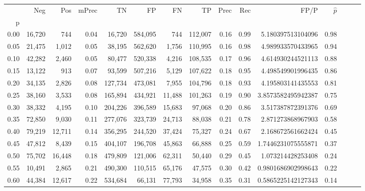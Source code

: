 \begin{tabular}{rrrrrrrrrrrrrrr}
\toprule
{} &     Neg &     Pos & mPrec &       TN &       FP &       FN &       TP &  Prec &   Rec &                  FP/P & $\hat{p}$ \\
p    &         &         &       &          &          &          &          &       &       &                       &           \\
\midrule
0.00 &  16,720 &     744 &  0.04 &   16,720 &  584,095 &      744 &  112,007 &  0.16 &  0.99 &     5.180397513104096 &      0.98 \\
0.05 &  21,475 &   1,012 &  0.05 &   38,195 &  562,620 &    1,756 &  110,995 &  0.16 &  0.98 &     4.989933570433965 &      0.94 \\
0.10 &  42,282 &   2,460 &  0.05 &   80,477 &  520,338 &    4,216 &  108,535 &  0.17 &  0.96 &     4.614930244521113 &      0.88 \\
0.15 &  13,122 &     913 &  0.07 &   93,599 &  507,216 &    5,129 &  107,622 &  0.18 &  0.95 &     4.498549901996435 &      0.86 \\
0.20 &  34,135 &   2,826 &  0.08 &  127,734 &  473,081 &    7,955 &  104,796 &  0.18 &  0.93 &     4.195803141435553 &      0.81 \\
0.25 &  38,160 &   3,533 &  0.08 &  165,894 &  434,921 &   11,488 &  101,263 &  0.19 &  0.90 &    3.8573582495942387 &      0.75 \\
0.30 &  38,332 &   4,195 &  0.10 &  204,226 &  396,589 &   15,683 &   97,068 &  0.20 &  0.86 &     3.517387872391376 &      0.69 \\
0.35 &  72,850 &   9,030 &  0.11 &  277,076 &  323,739 &   24,713 &   88,038 &  0.21 &  0.78 &     2.871273868967903 &      0.58 \\
0.40 &  79,219 &  12,711 &  0.14 &  356,295 &  244,520 &   37,424 &   75,327 &  0.24 &  0.67 &     2.168672561662424 &      0.45 \\
0.45 &  47,812 &   8,439 &  0.15 &  404,107 &  196,708 &   45,863 &   66,888 &  0.25 &  0.59 &    1.7446231075555871 &      0.37 \\
0.50 &  75,702 &  16,448 &  0.18 &  479,809 &  121,006 &   62,311 &   50,440 &  0.29 &  0.45 &     1.073214428253408 &      0.24 \\
0.55 &  10,491 &   2,865 &  0.21 &  490,300 &  110,515 &   65,176 &   47,575 &  0.30 &  0.42 &    0.9801686902998643 &      0.22 \\
0.60 &  44,384 &  12,617 &  0.22 &  534,684 &   66,131 &   77,793 &   34,958 &  0.35 &  0.31 &    0.5865225142127343 &      0.14 \\

\end{tabular}

